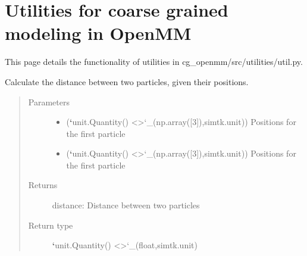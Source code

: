 \documentclass[letterpaper,12pt,english,openany,oneside]{sphinxmanual}
\begin{document}
\chapter{Utilities for coarse grained modeling in OpenMM}
\label{\detokenize{utilities:utilities-for-coarse-grained-modeling-in-openmm}}\label{\detokenize{utilities::doc}}
This page details the functionality of utilities in cg\_openmm/src/utilities/util.py.

\label{\detokenize{utilities:module-utilities.util}}

\begin{fulllineitems}
\label{\detokenize{utilities:utilities.util.distance}}
Calculate the distance between two particles, given their positions.
\begin{quote}\begin{description}
\item[{Parameters}] \leavevmode\begin{itemize}
\item {} 
 ({\color{red}\bfseries{}{}`}unit.Quantity() \textless{}\textgreater{}{}`\_(np.array({[}3{]}),simtk.unit)) \textendash{} Positions for the first particle

\item {} 
 ({\color{red}\bfseries{}{}`}unit.Quantity() \textless{}\textgreater{}{}`\_(np.array({[}3{]}),simtk.unit)) \textendash{} Positions for the first particle

\end{itemize}

\item[{Returns}] \leavevmode
distance: Distance between two particles

\item[{Return type}] \leavevmode
{\color{red}\bfseries{}{}`}unit.Quantity() \textless{}\textgreater{}{}`\_(float,simtk.unit)


\end{description}
\end{quote}
\end{fulllineitems}
\end{document}
